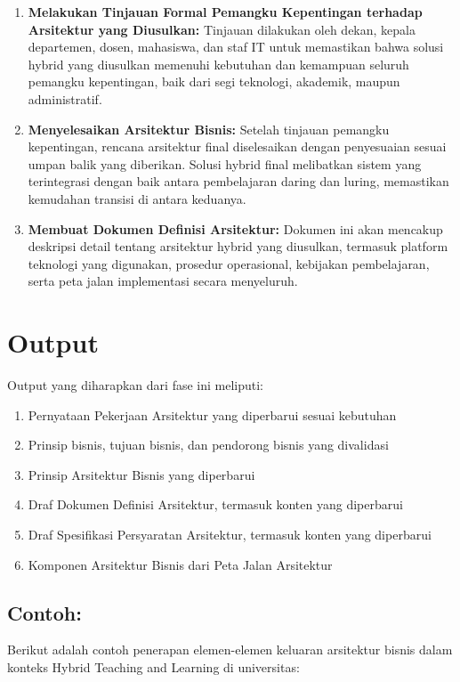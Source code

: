 \begin{enumerate}
	\item \textbf{Melakukan Tinjauan Formal Pemangku Kepentingan terhadap Arsitektur yang Diusulkan:}  
	Tinjauan dilakukan oleh dekan, kepala departemen, dosen, mahasiswa, dan staf IT untuk memastikan bahwa solusi hybrid yang diusulkan memenuhi kebutuhan dan kemampuan seluruh pemangku kepentingan, baik dari segi teknologi, akademik, maupun administratif.
	
	\item \textbf{Menyelesaikan Arsitektur Bisnis:}  
	Setelah tinjauan pemangku kepentingan, rencana arsitektur final diselesaikan dengan penyesuaian sesuai umpan balik yang diberikan. Solusi hybrid final melibatkan sistem yang terintegrasi dengan baik antara pembelajaran daring dan luring, memastikan kemudahan transisi di antara keduanya.
	
	\item \textbf{Membuat Dokumen Definisi Arsitektur:}  
	Dokumen ini akan mencakup deskripsi detail tentang arsitektur hybrid yang diusulkan, termasuk platform teknologi yang digunakan, prosedur operasional, kebijakan pembelajaran, serta peta jalan implementasi secara menyeluruh.
\end{enumerate}

\section{Output}
Output yang diharapkan dari fase ini meliputi:
\begin{enumerate}
	\item Pernyataan Pekerjaan Arsitektur yang diperbarui sesuai kebutuhan
	\item Prinsip bisnis, tujuan bisnis, dan pendorong bisnis yang divalidasi
	\item Prinsip Arsitektur Bisnis yang diperbarui
	\item Draf Dokumen Definisi Arsitektur, termasuk konten yang diperbarui
	\item Draf Spesifikasi Persyaratan Arsitektur, termasuk konten yang diperbarui
	\item Komponen Arsitektur Bisnis dari Peta Jalan Arsitektur
\end{enumerate}

\subsection*{Contoh:}
Berikut adalah contoh penerapan elemen-elemen keluaran arsitektur bisnis dalam konteks Hybrid Teaching and Learning di universitas:

